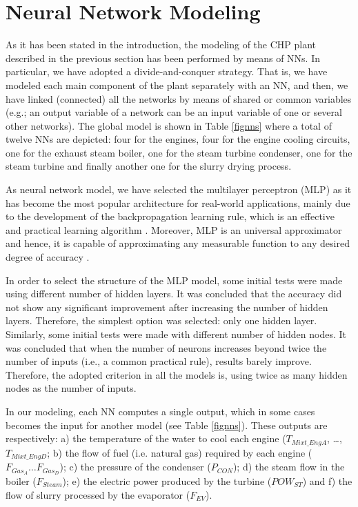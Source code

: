 \section{Neural Network Modeling}
\label{NN}

As it has been stated in the introduction, the modeling of the CHP plant described in the previous section has been performed by means of  NNs. In particular, we have adopted a divide-and-conquer strategy. That is, we have modeled each main component of the plant separately with an NN, and then, we have linked (connected) all the networks by means of shared or common variables (e.g.; an output variable of a network can be an input variable of one or several other networks). The global model is shown in Table \ref{fignns} where a total of twelve NNs are depicted: four for the engines, four for the engine cooling  circuits, one for the exhaust steam boiler, one for the steam turbine condenser, one for the steam turbine and finally another one for the slurry drying process. 

As neural network model, we have selected the multilayer perceptron (MLP) as it has become the most popular architecture for real-world applications, mainly due to the development of the backpropagation learning rule, which is an effective and practical learning algorithm \cite{Khota-1998}. Moreover, MLP  is an universal approximator and hence, it is capable of approximating any measurable function to any desired degree of accuracy \cite{Hornik-1989}.

In order to select the structure of the MLP model, some initial tests were made using different number of hidden layers. It was concluded that the accuracy did not show any significant improvement after increasing the number of hidden layers. Therefore, the simplest option was selected: only one hidden layer. Similarly, some initial tests were made with different number of hidden nodes. It was concluded that when the number of neurons increases beyond twice the number of inputs (i.e., a common practical rule), results barely improve. Therefore, the adopted criterion in all the models is, using twice as many hidden nodes as the number of inputs.

In our modeling,  each NN computes a single output, which in some cases becomes the input for another model (see Table \ref{fignns}).  These outputs are respectively: a) the temperature of the water to cool each engine ($T_{Mixt\_EngA}$, \dots, $T_{Mixt\_EngD}$; b) the flow of fuel (i.e. natural gas) required by each engine ($F_{Gas_A} \dots F_{Gas_D}$); c) the pressure of the condenser ($P_{CON}$); d) the steam flow in the boiler ($F_{Steam}$); e) the electric power produced by the turbine ($POW_{ST}$) and f) the flow of slurry processed by the evaporator ($F_{EV}$).


